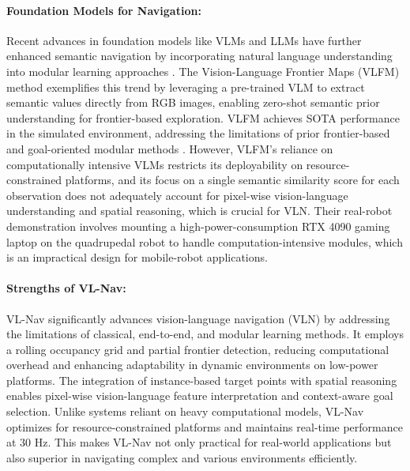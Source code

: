 \paragraph{Foundation Models for Navigation:}
Recent advances in foundation models like VLMs and LLMs have further enhanced semantic navigation by incorporating natural language understanding into modular learning approaches \cite{gadre2023cows, yin2025sg, liu2024dynamem, yokoyama2024vlfm}. 
The Vision-Language Frontier Maps (VLFM) method \cite{yokoyama2024vlfm} exemplifies this trend by leveraging a pre-trained VLM to extract semantic values directly from RGB images, enabling zero-shot semantic prior understanding for frontier-based exploration. 
VLFM achieves SOTA performance in the simulated environment, addressing the limitations of prior frontier-based and goal-oriented modular methods \cite{yamauchi1997frontier,freda2005frontier,chaplot2020object,luo2022stubborn}. 
However, VLFM's reliance on computationally intensive VLMs restricts its deployability on resource-constrained platforms, and its focus on a single semantic similarity score for each observation does not adequately account for pixel-wise vision-language understanding and spatial reasoning, which is crucial for VLN. 
Their real-robot demonstration involves mounting a high-power-consumption RTX 4090 gaming laptop on the quadrupedal robot to handle computation-intensive modules, which is an impractical design for mobile-robot applications.



\paragraph{Strengths of VL-Nav:}
VL-Nav significantly advances vision-language navigation (VLN) by addressing the limitations of classical, end-to-end, and modular learning methods. It employs a rolling occupancy grid and partial frontier detection, reducing computational overhead and enhancing adaptability in dynamic environments on low-power platforms. The integration of instance-based target points with spatial reasoning enables pixel-wise vision-language feature interpretation and context-aware goal selection. Unlike systems reliant on heavy computational models, VL-Nav optimizes for resource-constrained platforms and maintains real-time performance at 30 Hz. This makes VL-Nav not only practical for real-world applications but also superior in navigating complex and various environments efficiently.


